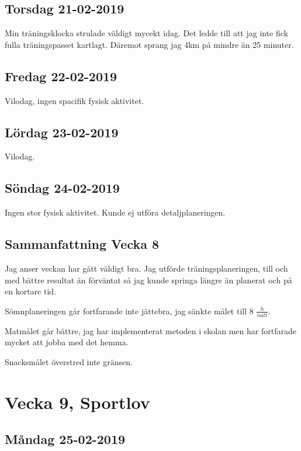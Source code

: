 \documentclass[a4paper, 12pt]{article}
\begin{document}
\subsection{Torsdag 21-02-2019}

    Min träningsklocka strulade väldigt mycekt idag. Det ledde till att jag inte fick fulla träningspasset kartlagt. Däremot sprang jag 4km på mindre än 25 minuter.


\subsection{Fredag 22-02-2019}

    Vilodag, ingen spacifik fysisk aktivitet. 

\subsection{Lördag 23-02-2019}

    Vilodag.

\subsection{Söndag 24-02-2019}

    Ingen stor fysisk aktivitet. Kunde ej utföra detaljplaneringen. 

\subsection{Sammanfattning Vecka 8}

    Jag anser veckan har gått väldigt bra. Jag utförde träningsplaneringen, till och med bättre resultat än förväntat så jag kunde springa längre än planerat och på en kortare tid. 
    
    Sömnplaneringen går fortfarande inte jättebra, jag sänkte målet till 8 $\frac{h}{natt}$.
    
    Matmålet går bättre, jag har implementerat metoden i skolan men har fortfarade mycket att jobba med det hemma.
    
    Snacksmålet överstred inte gränsen. 


\section{Vecka 9, Sportlov}

\subsection{Måndag 25-02-2019}
\end{document}
